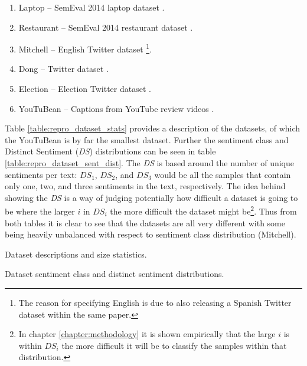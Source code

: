 \begin{enumerate}
    \item Laptop -- SemEval 2014 laptop dataset \citep{pontiki-etal-2014-semeval}.
    \item Restaurant -- SemEval 2014 restaurant dataset \citep{pontiki-etal-2014-semeval}.
    \item Mitchell -- English Twitter dataset \citep{mitchell-etal-2013-open}\footnote{The reason for specifying English is due to \citet{mitchell-etal-2013-open} also releasing a Spanish Twitter dataset within the same paper.}.
    \item Dong -- Twitter dataset \citep{dong-etal-2014-adaptive}.
    \item Election -- Election Twitter dataset \citep{wang-etal-2017-tdparse}.
    \item YouTuBean -- Captions from YouTube review videos \citep{marrese-taylor-etal-2017-mining}.
\end{enumerate}

Table \ref{table:repro_dataset_stats} provides a description of the datasets, of which the YouTuBean is by far the smallest dataset. Further the sentiment class and Distinct Sentiment (\textit{DS}) distributions can be seen in table \ref{table:repro_dataset_sent_dist}. The \textit{DS} \citep{wang-etal-2017-tdparse} is based around the number of unique sentiments per text: $DS_1$, $DS_2$, and $DS_3$ would be all the samples that contain only one, two, and three sentiments in the text, respectively. The idea behind showing the \textit{DS} is a way of judging potentially how difficult a dataset is going to be where the larger $i$ in $DS_i$ the more difficult the dataset might be\footnote{In chapter \ref{chapter:methodology} it is shown empirically that the large $i$ is within $DS_i$ the more difficult it will be to classify the samples within that distribution.}. Thus from both tables it is clear to see that the datasets are all very different with some being heavily unbalanced with respect to sentiment class distribution (Mitchell). 

\begin{table}[!h]
    \centering
    
    \caption{Dataset descriptions and size statistics.}
    \label{table:repro_dataset_stats}
\end{table}

\begin{table}[!h]
    \centering
    
    \caption{Dataset sentiment class and distinct sentiment distributions.}
    \label{table:repro_dataset_sent_dist}
\end{table}

